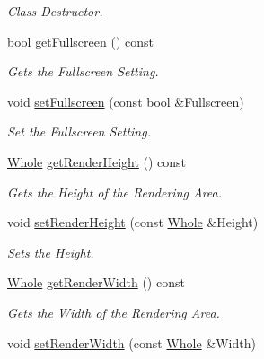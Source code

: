 \begin{DoxyCompactItemize}
\begin{DoxyCompactList}\small\item\em Class Destructor. \item\end{DoxyCompactList}\item 
bool \hyperlink{classphys_1_1GraphicsManager_ad126eedb81e3f0304731ddd33b617593}{getFullscreen} () const 
\begin{DoxyCompactList}\small\item\em Gets the Fullscreen Setting. \item\end{DoxyCompactList}\item 
void \hyperlink{classphys_1_1GraphicsManager_aeea7f2f26a3f9a53754ad34219f75e99}{setFullscreen} (const bool \&Fullscreen)
\begin{DoxyCompactList}\small\item\em Set the Fullscreen Setting. \item\end{DoxyCompactList}\item 
\hyperlink{namespacephys_a460f6bc24c8dd347b05e0366ae34f34a}{Whole} \hyperlink{classphys_1_1GraphicsManager_a38ee0f8a8a7d8ba861b1c6cfe579443e}{getRenderHeight} () const 
\begin{DoxyCompactList}\small\item\em Gets the Height of the Rendering Area. \item\end{DoxyCompactList}\item 
void \hyperlink{classphys_1_1GraphicsManager_afc98369b4c2664990c6b5a0370e5e74e}{setRenderHeight} (const \hyperlink{namespacephys_a460f6bc24c8dd347b05e0366ae34f34a}{Whole} \&Height)
\begin{DoxyCompactList}\small\item\em Sets the Height. \item\end{DoxyCompactList}\item 
\hyperlink{namespacephys_a460f6bc24c8dd347b05e0366ae34f34a}{Whole} \hyperlink{classphys_1_1GraphicsManager_a9e1ce1f9f8bcff7712fd5beaf7cf2337}{getRenderWidth} () const 
\begin{DoxyCompactList}\small\item\em Gets the Width of the Rendering Area. \item\end{DoxyCompactList}\item 
void \hyperlink{classphys_1_1GraphicsManager_a00215d086bc439c64906186f02a9bd76}{setRenderWidth} (const \hyperlink{namespacephys_a460f6bc24c8dd347b05e0366ae34f34a}{Whole} \&Width)

\end{DoxyCompactItemize}
